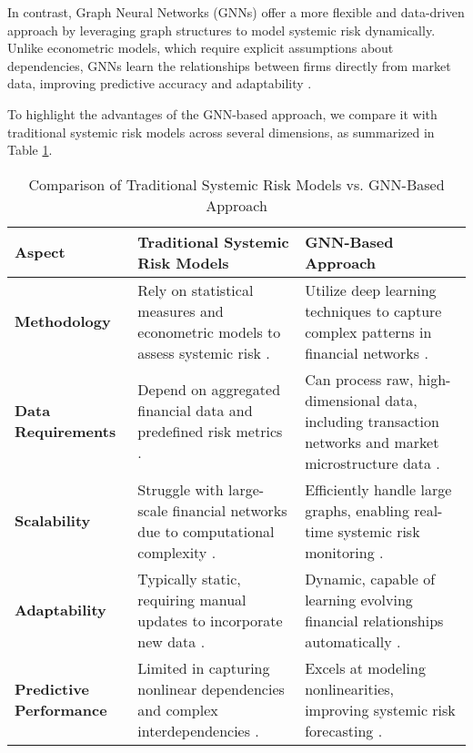 \documentclass[preprint,12pt,authoryear]{elsarticle}
\begin{document}
In contrast, Graph Neural Networks (GNNs) offer a more flexible and data-driven approach by leveraging graph structures to model systemic risk dynamically. Unlike econometric models, which require explicit assumptions about dependencies, GNNs learn the relationships between firms directly from market data, improving predictive accuracy and adaptability \cite{soramaki2007topology}.  

To highlight the advantages of the GNN-based approach, we compare it with traditional systemic risk models across several dimensions, as summarized in Table \ref{tab:comparison}.  

\begin{table}[h]
    \centering
    \caption{Comparison of Traditional Systemic Risk Models vs. GNN-Based Approach}
    \renewcommand{\arraystretch}{1.3}
    \begin{tabular}{|p{4cm}|p{5cm}|p{5cm}|}
        \hline
        \textbf{Aspect} & \textbf{Traditional Systemic Risk Models} & \textbf{GNN-Based Approach} \\
        \hline
        \textbf{Methodology} & Rely on statistical measures and econometric models to assess systemic risk \cite{bisias2012survey}. & Utilize deep learning techniques to capture complex patterns in financial networks \cite{das2020matrix}. \\
        \hline
        \textbf{Data Requirements} & Depend on aggregated financial data and predefined risk metrics \cite{acemoglu2015systemic}. & Can process raw, high-dimensional data, including transaction networks and market microstructure data \cite{bostanci2020assessing}. \\
        \hline
        \textbf{Scalability} & Struggle with large-scale financial networks due to computational complexity \cite{bisias2012survey}. & Efficiently handle large graphs, enabling real-time systemic risk monitoring \cite{das2020matrix}. \\
        \hline
        \textbf{Adaptability} & Typically static, requiring manual updates to incorporate new data \cite{acemoglu2015systemic}. & Dynamic, capable of learning evolving financial relationships automatically \cite{soramaki2007topology}. \\
        \hline
        \textbf{Predictive Performance} & Limited in capturing nonlinear dependencies and complex interdependencies \cite{bisias2012survey}. & Excels at modeling nonlinearities, improving systemic risk forecasting \cite{bostanci2020assessing}. \\
        \hline
    \end{tabular}
    \label{tab:comparison}
\end{table}
\end{document}
